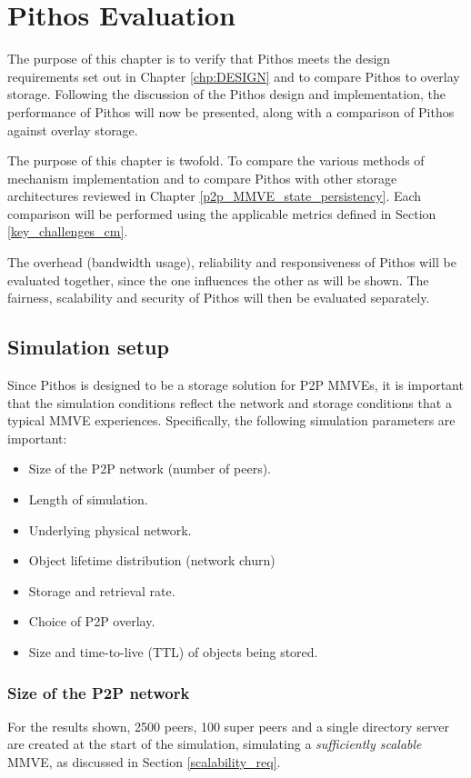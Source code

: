 \chapter{Pithos Evaluation}
\label{chp:EVALUATION}

The purpose of this chapter is to verify that Pithos meets the design requirements set out in Chapter \ref{chp:DESIGN} and to compare Pithos to overlay storage. Following the discussion of the Pithos design and implementation, the performance of Pithos will now be presented, along with a comparison of Pithos against overlay storage.

The purpose of this chapter is twofold. To compare the various methods of mechanism implementation and to compare Pithos with other storage architectures reviewed in Chapter \ref{p2p_MMVE_state_persistency}. Each comparison will be performed using the applicable metrics defined in Section \ref{key_challenges_cm}.

The overhead (bandwidth usage), reliability and responsiveness of Pithos will be evaluated together, since the one influences the other as will be shown. The fairness, scalability and security of Pithos will then be evaluated separately.

\section{Simulation setup}
\label{simulation_setup}

Since Pithos is designed to be a storage solution for P2P MMVEs, it is important that the simulation conditions reflect the network and storage conditions that a typical MMVE experiences. Specifically, the following simulation parameters are important:
%
\begin{itemize}
\item Size of the P2P network (number of peers).
\item Length of simulation.
\item Underlying physical network.
\item Object lifetime distribution (network churn)
\item Storage and retrieval rate.
\item Choice of P2P overlay.
\item Size and time-to-live (TTL) of objects being stored.
\end{itemize}

\subsection{Size of the P2P network}
For the results shown, 2500 peers, 100 super peers and a single directory server are created at the start of the simulation, simulating a \emph{sufficiently scalable} MMVE, as discussed in Section \ref{scalability_req}.

